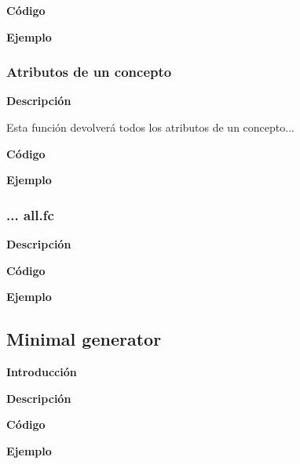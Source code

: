         \textbf{C\'odigo}

        


        \textbf{Ejemplo}



    \subsubsection{Atributos de un concepto}

    
        \textbf{Descripci\'on}

        Esta funci\'on devolver\'a todos los atributos de un concepto...

        \textbf{C\'odigo}

        

        \textbf{Ejemplo}



    \subsubsection{... all.fc}

    
        \textbf{Descripci\'on}


        \textbf{C\'odigo}

        


        \textbf{Ejemplo}



\subsection{Minimal generator}


    \textbf{Introducci\'on}


    \textbf{Descripci\'on}


    \textbf{C\'odigo}


    \textbf{Ejemplo}

